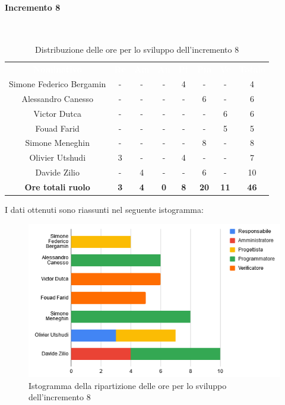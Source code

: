 \paragraph*{Incremento 8}\mbox{} \\
\begin{table}[H]
\centering\renewcommand{\arraystretch}{1.5}
\caption{Distribuzione delle ore per lo sviluppo dell'incremento 8}
\vspace{0.2cm}
\begin{tabular}{ c c c c c c c c }
\rowcolor{redafk}
\textcolor{white}{\textbf{Nominativo}} & \textcolor{white}{\textbf{Re}} &
\textcolor{white}{\textbf{Am}} & \textcolor{white}{\textbf{An}} &
\textcolor{white}{\textbf{Pt}} & \textcolor{white}{\textbf{Pm}} &
\textcolor{white}{\textbf{Ve}} & \textcolor{white}{\textbf{Totale}} \\
Simone Federico Bergamin & - & - & - & 4 & - & - & 4 \\
Alessandro Canesso & - & - & - & - & 6 & - & 6 \\
Victor Dutca & - & - & - & - & - & 6 & 6 \\
Fouad Farid & - & - & - & - & - & 5 & 5 \\
Simone Meneghin & - & - & - & - & 8 & - & 8 \\
Olivier Utshudi & 3 & - & - & 4 & - & - & 7 \\
Davide Zilio & - & 4 & - & - & 6 & - & 10 \\
\rowcolor{lastrowcolor}
\textbf{Ore totali ruolo} & \textbf{3} & \textbf{4} & \textbf{0} & \textbf{8} & \textbf{20} & \textbf{11} & \textbf{46} \\
\end{tabular}
\end{table}

I dati ottenuti sono riassunti nel seguente istogramma:
\begin{figure}[H]
\centering
\includegraphics[scale=0.60]{img/grafici/tabella_inc8.png}
\caption{Istogramma della ripartizione delle ore per lo sviluppo dell'incremento 8}
\end{figure}

